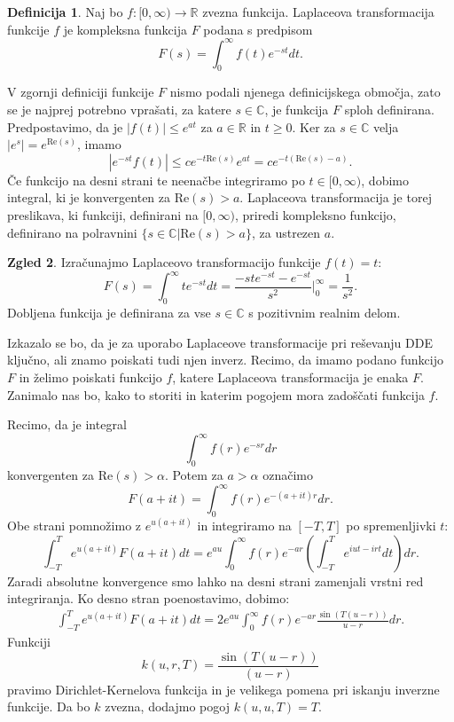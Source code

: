 \documentclass[12pt,a4paper]{amsart}
\theoremstyle{definition} %
\newtheorem{definicija}{Definicija}[section]
\newtheorem{zgled}[definicija]{Zgled}
\theoremstyle{plain} %
\newcommand{\R}{\mathbb R}
\newcommand{\C}{\mathbb C}
\begin{document}
\begin{definicija}
    Naj bo $f:[0,\infty) \to \R$ zvezna funkcija. Laplaceova transformacija funkcije $f$ je kompleksna funkcija
    $F$ podana s predpisom
    \[ F(s)=\int_{0}^{\infty}f(t)e^{-st}dt.\]
\end{definicija}

\noindent V zgornji definiciji funkcije $F$ nismo podali njenega definicijskega območja, zato se je
najprej potrebno vprašati, za katere $s\in\C$, je funkcija $F$ sploh definirana. Predpostavimo, da je
$|f(t)|\leq e^{at}$ za $a\in\R$ in $t\geq0$. Ker za $s\in\C$ velja $|e^{s}|=e^{\text{Re}(s)}$, imamo
\[|e^{-st}f(t)| \leq ce^{-t\text{Re}(s)}e^{at}=ce^{-t(\text{Re}(s)-a)}.\]
Če funkcijo na desni strani te neenačbe integriramo po $t\in [0,\infty)$, dobimo integral, ki je konvergenten za $\text{Re}(s)>a$.
Laplaceova transformacija je torej preslikava, ki funkciji, definirani na $[0,\infty)$, priredi
kompleksno funkcijo, definirano na polravnini $\{s\in\C | \text{Re}(s)>a\}$, za ustrezen $a$.

\begin{zgled}
    Izračunajmo Laplaceovo transformacijo funkcije $f(t)=t$:
    \[F(s)=\int_0^{\infty}te^{-st}dt = \frac{-ste^{-st}-e^{-st}}{s^2}\Bigr|_{0}^{\infty}=\frac{1}{s^2}.\]
    Dobljena funkcija je definirana za vse $s\in\C$ s pozitivnim realnim delom.
\end{zgled}


Izkazalo se bo, da je za uporabo Laplaceove transformacije pri reševanju DDE ključno, 
ali znamo poiskati tudi njen inverz.
Recimo, da imamo podano funkcijo
$F$ in želimo poiskati funkcijo $f$, katere Laplaceova transformacija je enaka $F$.
Zanimalo nas bo, kako to storiti in katerim pogojem mora zadoščati funkcija $f$.

Recimo, da je integral 
\[\int_0^{\infty}f(r)e^{-sr}dr\]
konvergenten za $\text{Re}(s)>\alpha$. Potem za $a>\alpha$ označimo
\[F(a+it)=\int_0^{\infty}f(r)e^{-(a+it)r}dr.\]
Obe strani pomnožimo z $e^{u(a+it)}$ in integriramo na $[-T,T]$ po spremenljivki $t$:
\[\int_{-T}^{T}e^{u(a+it)}F(a+it)dt=e^{au}\int_0^{\infty}f(r)e^{-ar}\left(\int_{-T}^{T}e^{iut-irt}dt\right)dr.\]
Zaradi absolutne konvergence smo lahko na desni strani zamenjali vrstni red integriranja.
Ko desno stran poenostavimo, dobimo:
\begin{equation} \label{eq2}
    \begin{split}
        \int_{-T}^{T}e^{u(a+it)}F(a+it)dt=2e^{au}\int_0^{\infty}f(r)e^{-ar}\frac{\sin(T(u-r))}{u-r}dr.
    \end{split}
\end{equation}
Funkciji $$k(u,r,T)=\frac{\sin(T(u-r))}{(u-r)}$$ pravimo Dirichlet-Kernelova funkcija in je velikega pomena 
pri iskanju inverzne funkcije. Da bo $k$ zvezna, dodajmo pogoj $k(u,u,T)=T$. %
\end{document}
